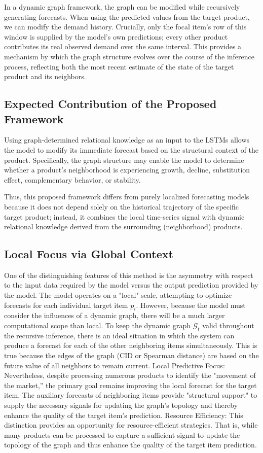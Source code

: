 In a dynamic graph framework, the graph can be modified while recursively generating forecasts. When using the predicted values from the target product, we can modify the demand history. Crucially, only the focal item's row of this window is supplied by the model's own predictions; every other product contributes its real observed demand over the same interval. This provides a mechanism by which the graph structure evolves over the course of the inference process, reflecting both the most recent estimate of the state of the target product and its neighbors.

\subsection{Expected Contribution of the Proposed Framework} 
\label{subsec:expected_contribution_framework}

Using graph-determined relational knowledge as an input to the LSTMs allows the model to modify its immediate forecast based on the structural context of the product. Specifically, the graph structure may enable the model to determine whether a product's neighborhood is experiencing growth, decline, substitution effect, complementary behavior, or stability.

Thus, this proposed framework differs from purely localized forecasting models because it does not depend solely on the historical trajectory of the specific target product; instead, it combines the local time-series signal with dynamic relational knowledge derived from the surrounding (neighborhood) products.

\subsection{Local Focus via Global Context}
One of the distinguishing features of this method is the asymmetry with respect to the input data required by the model versus the output prediction provided by the model. The model operates on a "local" scale, attempting to optimize forecasts for each individual target item $p_i$. However, because the model must consider the influences of a dynamic graph, there will be a much larger computational scope than local.
To keep the dynamic graph $\mathcal{G}_t$ valid throughout the recursive inference, there is an ideal situation in which the system can produce a forecast for each of the other neighboring items simultaneously. This is true because the edges of the graph (CID or Spearman distance) are based on the future value of all neighbors to remain current. Local Predictive Focus: Nevertheless, despite processing numerous products to identify the "movement of the market,” the primary goal remains improving the local forecast for the target item. The auxiliary forecasts of neighboring items provide "structural support" to supply the necessary signals for updating the graph's topology and thereby enhance the quality of the target item's prediction. Resource Efficiency: This distinction provides an opportunity for resource-efficient strategies. That is, while many products can be processed to capture a sufficient signal to update the topology of the graph and thus enhance the quality of the target item prediction.